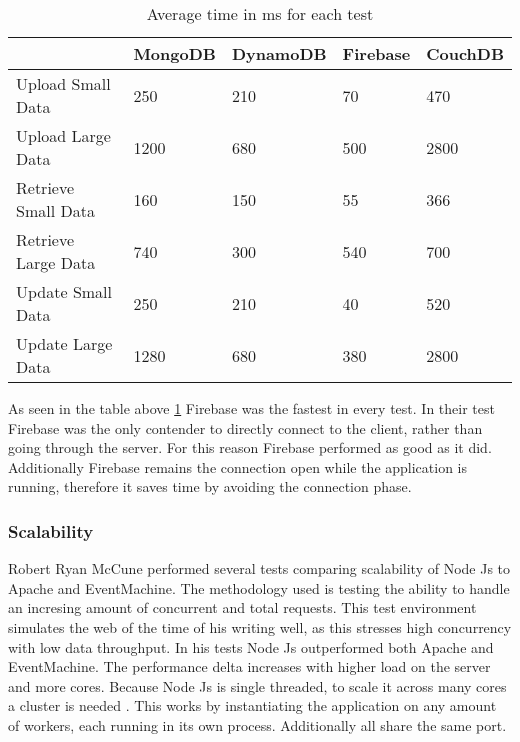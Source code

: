 \begin{table}[h!]
    \centering
     \begin{tabular}{|m{1cm} m{1.5cm} m{1.5cm} m{1.5cm} m{1.5cm}|} 
         \hline
          & MongoDB & DynamoDB & Firebase & CouchDB \\ [0.5ex] 
         \hline\hline
         Upload Small Data & 250 & 210 & 70 & 470 \\ 
         \hline
         Upload Large Data & 1200 & 680 & 500 & 2800 \\
         \hline
         Retrieve Small Data & 160 & 150 & 55 & 366 \\
         \hline
         Retrieve Large Data & 740 & 300 & 540 & 700 \\
         \hline
         Update Small Data & 250 & 210 & 40 & 520 \\
         \hline
         Update Large Data & 1280 & 680 & 380 & 2800 \\
         \hline
        \end{tabular}
    \caption{Average time in ms for each test}
    \label{tab:perf_avg}
\end{table}

As seen in the table above \ref{tab:perf_avg} Firebase was the fastest in every test. In their \cite{almootassem2017cloud} test Firebase was the only contender to directly connect to the client, rather than going through the server. For this reason Firebase performed as good as it did. Additionally Firebase remains the connection open while the application is running, therefore it saves time by avoiding the connection phase.
     
\subsubsection{Scalability}

Robert Ryan McCune \cite{mccune2011node} performed several tests comparing scalability of Node Js to Apache and EventMachine. The methodology used is testing the ability to handle an incresing amount of concurrent and total requests. This test environment simulates the web of the time of his writing well, as this stresses high concurrency with low data throughput. In his tests Node Js outperformed both Apache and EventMachine. The performance delta increases with higher load on the server and more cores. Because Node Js is single threaded, to scale it across many cores a cluster is needed \cite{NodeCluster}. This works by instantiating the application on any amount of workers, each running in its own process. Additionally all share the same port.

